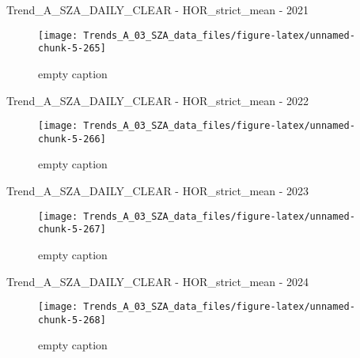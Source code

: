 \documentclass[
  10pt,
  a4paper,oneside]{article}
\begin{document}
Trend\_A\_SZA\_DAILY\_CLEAR - HOR\_strict\_mean - 2021

\begin{figure}[!ht]

{\centering \texttt{[image: Trends\_A\_03\_SZA\_data\_files/figure-latex/unnamed-chunk-5-265]} 

}

\caption{ empty caption }\label{fig:unnamed-chunk-5-265}
\end{figure}

Trend\_A\_SZA\_DAILY\_CLEAR - HOR\_strict\_mean - 2022

\begin{figure}[!ht]

{\centering \texttt{[image: Trends\_A\_03\_SZA\_data\_files/figure-latex/unnamed-chunk-5-266]} 

}

\caption{ empty caption }\label{fig:unnamed-chunk-5-266}
\end{figure}

Trend\_A\_SZA\_DAILY\_CLEAR - HOR\_strict\_mean - 2023

\begin{figure}[!ht]

{\centering \texttt{[image: Trends\_A\_03\_SZA\_data\_files/figure-latex/unnamed-chunk-5-267]} 

}

\caption{ empty caption }\label{fig:unnamed-chunk-5-267}
\end{figure}

Trend\_A\_SZA\_DAILY\_CLEAR - HOR\_strict\_mean - 2024

\begin{figure}[!ht]

{\centering \texttt{[image: Trends\_A\_03\_SZA\_data\_files/figure-latex/unnamed-chunk-5-268]} 

}

\caption{ empty caption }\label{fig:unnamed-chunk-5-268}
\end{figure}
\end{document}
